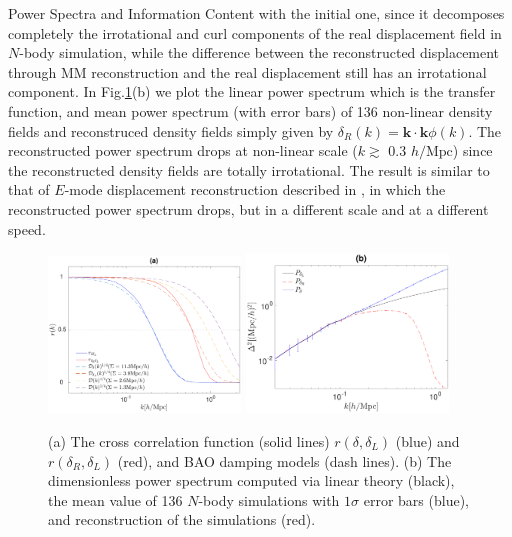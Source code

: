 \begin{section}{Power Spectra and Information Content}
with the initial one, since it decomposes completely the irrotational and curl components of the real displacement 
field in $N$-body simulation, while the difference between the reconstructed displacement through MM reconstruction 
and the real displacement still has an irrotational component.
 In Fig.\ref{fig:cross-correlation-power}(b) we plot the linear power spectrum which is the transfer function, and mean 
power spectrum (with error bars) of 136 non-linear density fields and reconstruced density fields simply 
given by $\delta_R(k)=\bm{k}\cdot\bm{k}\phi(k)$. The reconstructed power spectrum drops at non-linear scale ($k \gtrsim$ 0.3 $h/\mathrm{Mpc}$) 
since the reconstructed density fields are totally irrotational. The result is similar to that of 
$E$-mode displacement reconstruction described in \cite{bib:Yu2016}, in which the reconstructed power spectrum 
drops, but in a different scale and at a different speed.
\begin{figure}
\centering
\includegraphics[width=0.455\textwidth]{cross_correlation_best_analysis-crop.pdf} 
\includegraphics[width=0.48\textwidth]{power_best_analysis-crop.pdf}
\caption{(a) The cross correlation function (solid lines) $r(\delta,\delta_L)$ (blue) and $r(\delta_R,\delta_L)$ (red), 
and BAO damping models (dash lines). 
(b) The dimensionless power spectrum computed via linear theory (black), the mean value of 136 $N$-body simulations
with $1\sigma$ error bars (blue), and reconstruction of the simulations (red).}
\label{fig:cross-correlation-power}
\end{figure}


\end{section}

